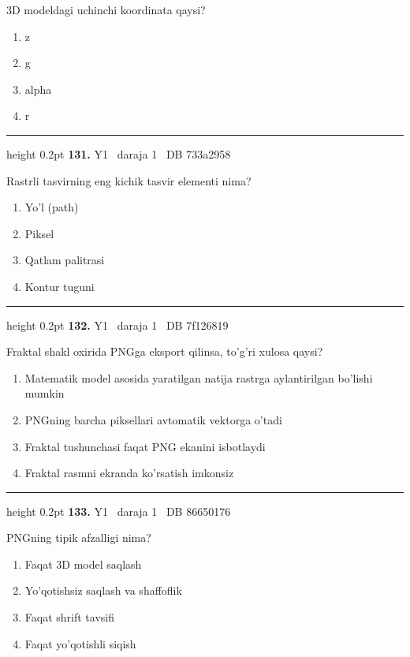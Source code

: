 \documentclass[10pt,a4paper,oneside]{article}
\begin{document}
\par
3D modeldagi uchinchi koordinata qaysi?
\begin{enumerate}[label=\Alph*),leftmargin=9mm]
\item z
\item g
\item alpha
\item r
\end{enumerate}
\vspace{2mm}\hrule height 0.2pt \vspace{4mm}
\hypertarget{q131}{\textbf{\color{ink}131.}}  {\color{muted}\scriptsize Y1 \textbullet\ daraja 1 \textbullet\ DB 733a2958}
\par
Rastrli tasvirning eng kichik tasvir elementi nima?
\begin{enumerate}[label=\Alph*),leftmargin=9mm]
\item Yo'l (path)
\item Piksel
\item Qatlam palitrasi
\item Kontur tuguni
\end{enumerate}
\vspace{2mm}\hrule height 0.2pt \vspace{4mm}
\hypertarget{q132}{\textbf{\color{ink}132.}}  {\color{muted}\scriptsize Y1 \textbullet\ daraja 1 \textbullet\ DB 7f126819}
\par
Fraktal shakl oxirida PNGga eksport qilinsa, to'g'ri xulosa qaysi?
\begin{enumerate}[label=\Alph*),leftmargin=9mm]
\item Matematik model asosida yaratilgan natija rastrga aylantirilgan bo'lishi mumkin
\item PNGning barcha piksellari avtomatik vektorga o'tadi
\item Fraktal tushunchasi faqat PNG ekanini isbotlaydi
\item Fraktal rasmni ekranda ko'rsatish imkonsiz
\end{enumerate}
\vspace{2mm}\hrule height 0.2pt \vspace{4mm}
\hypertarget{q133}{\textbf{\color{ink}133.}}  {\color{muted}\scriptsize Y1 \textbullet\ daraja 1 \textbullet\ DB 86650176}
\par
PNGning tipik afzalligi nima?
\begin{enumerate}[label=\Alph*),leftmargin=9mm]
\item Faqat 3D model saqlash
\item Yo'qotishsiz saqlash va shaffoflik
\item Faqat shrift tavsifi
\item Faqat yo'qotishli siqish
\end{enumerate}
\end{document}
